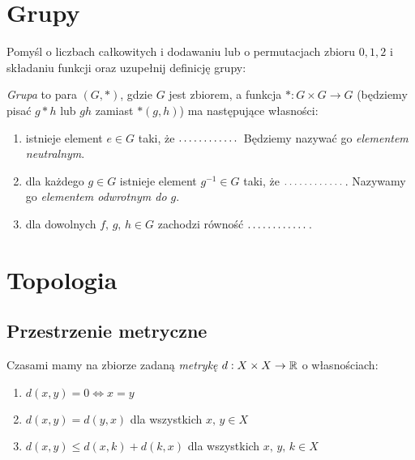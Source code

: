 \section{Grupy}

\begin{prob}
  Pomyśl o liczbach całkowitych i dodawaniu lub o permutacjach zbioru ${0,1,2}$ i składaniu funkcji oraz uzupełnij definicję grupy:

  \emph{Grupa} to para $(G, *)$, gdzie $G$ jest zbiorem, a funkcja $*: G\times G\to G$ (będziemy pisać $g*h$ lub $gh$ zamiast $*(g,h)$) ma następujące własności:
  \begin{enumerate}
    \item istnieje element $e\in G$ taki, że $\dots\dots\dots\dots$ Będziemy nazywać go \emph{elementem neutralnym}.
    \item dla każdego $g\in G$ istnieje element $g^{-1}\in G$ taki, że $\dots\dots\dots\dots$. Nazywamy go
      \emph{elementem odwrotnym do $g$}.
      \item dla dowolnych $f,\, g,\, h\in G$ zachodzi równość $\dots\dots\dots\dots$.
    \end{enumerate}
\end{prob}

\vspace{-1cm}




\section{Topologia}
\subsection{Przestrzenie metryczne}
Czasami mamy na zbiorze zadaną \emph{metrykę} $d:X\times X\to \mathbb{R}$ o własnościach:

\begin{enumerate}
  \item $d(x,y)=0\Leftrightarrow x=y$
  \item $d(x,y)=d(y,x)$ dla wszystkich $x,\, y\in X$
  \item $d(x,y) \le d(x,k) + d(k, x)$ dla wszystkich $x,\, y,\, k\in X$
\end{enumerate}

